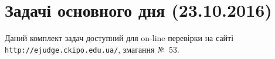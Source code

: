 \documentclass[11pt,a5paper]{extarticle}
\begin{document}
\def\myhrulefill{\vspace{12mm}\par\vspace*{-12mm}\par\hrulefill}


\tableofcontents





\section{Задачі основного дня (23.10.2016)}

Даний комплект задач доступний для on-line перевірки 
на сайті \verb"http://ejudge.ckipo.edu.ua/", змагання №~53.


\newenvironment{problemAllDefault}[1]{\vspace{10mm}\par\begin{problem}{#1}{\begin{scriptsize}stdin.txt або клавіатура (ст. вхід)\end{scriptsize}}{\begin{scriptsize}stdout.txt або екран (ст. вихід)\end{scriptsize}}{1 сек}{256 мегабайтів}}{\end{problem}}

\vspace{-\baselineskip}






\end{document}
